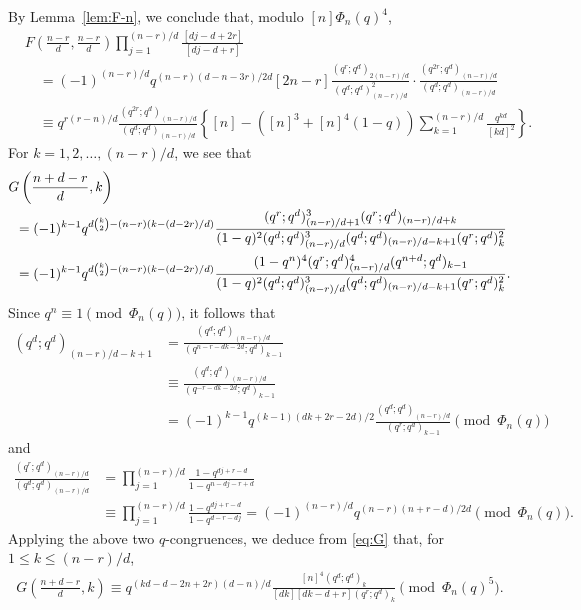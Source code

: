 \documentclass[12pt]{article}
\numberwithin{equation}{section}
\begin{document}
By Lemma~\ref{lem:F-n}, we conclude that, modulo $[n]\Phi_n(q)^4$,
\begin{align}\label{eq:F-final}
    &F\left(\frac{n-r}{d},\frac{n-r}{d}\right)\prod_{j=1}^{(n-r)/d}\frac{[dj-d+2r]}{[dj-d+r]}\nonumber\\
    &\hspace{1em}=(-1)^{(n-r)/d}q^{(n-r)(d-n-3r)/2d}[2n-r]\frac{(q^r;q^d)_{2(n-r)/d}}{(q^d;q^d)^2_{(n-r)/d}}\cdot
    \frac{(q^{2r};q^d)_{(n-r)/d}}{(q^d;q^d)_{(n-r)/d}}\nonumber\\
    &\hspace{1em}\equiv q^{r(r-n)/d}\frac{(q^{2r};q^d)_{(n-r)/d}}{(q^d;q^d)_{(n-r)/d}}\left\{[n]-([n]^3+[n]^4(1-q))
    \sum_{k=1}^{(n-r)/d}\frac{q^{kd}}{[kd]^2}\right\}.
\end{align}
For $k=1,2,\dots,(n-r)/d$, we see that 
\begin{align}\label{eq:G}
    &G\left(\frac{n+d-r}{d},k\right)\nonumber\\
    &\hspace{0.5em}=(-1)^{k-1}q^{d\binom{k}{2}-(n-r)(k-(d-2r)/d)}\frac{(q^r;q^d)^3_{(n-r)/d+1}(q^r;q^d)_{(n-r)/d+k}}
    {(1-q)^2(q^d;q^d)^3_{(n-r)/d}(q^d;q^d)_{(n-r)/d-k+1}(q^r;q^d)_k^2}\nonumber\\
    &\hspace{0.5em}=(-1)^{k-1}q^{d\binom{k}{2}-(n-r)(k-(d-2r)/d)}\frac{(1-q^n)^4(q^r;q^d)^4_{(n-r)/d}(q^{n+d};q^d)_{k-1}}
    {(1-q)^2(q^d;q^d)^3_{(n-r)/d}(q^d;q^d)_{(n-r)/d-k+1}(q^r;q^d)^2_k}.
\end{align}
Since $q^n\equiv 1\pmod{\Phi_n(q)}$, it follows that 
\begin{align*}
    (q^d;q^d)_{(n-r)/d-k+1}&=\frac{(q^d;q^d)_{(n-r)/d}}{(q^{n-r-dk-2d};q^d)_{k-1}}\nonumber\\
    &\equiv \frac{(q^d;q^d)_{(n-r)/d}}{(q^{-r-dk-2d};q^d)_{k-1}}\nonumber\\
    &=(-1)^{k-1}q^{(k-1)(dk+2r-2d)/2}\frac{(q^d;q^d)_{(n-r)/d}}{(q^{r};q^d)_{k-1}}\pmod{\Phi_n(q)}
\end{align*}
and 
\begin{align*}
    \frac{(q^r;q^d)_{(n-r)/d}}{(q^{d};q^d)_{(n-r)/d}}&=\prod_{j=1}^{(n-r)/d}\frac{1-q^{dj+r-d}}{1-q^{n-dj-r+d}}\nonumber\\
    &\equiv \prod_{j=1}^{(n-r)/d}\frac{1-q^{dj+r-d}}{1-q^{d-r-dj}}=(-1)^{(n-r)/d}q^{(n-r)(n+r-d)/2d}\pmod{\Phi_n(q)}.
\end{align*}
Applying the above two $q$-congruences, we deduce from \eqref{eq:G} that, for $1\leqslant k \leqslant (n-r)/d$,
\begin{align*}
    G\left(\frac{n+d-r}{d},k\right)\equiv q^{(kd-d-2n+2r)(d-n)/d}\frac{[n]^4(q^d;q^d)_{k}}{[dk][dk-d+r](q^r;q^d)_{k}}\pmod{\Phi_n(q)^5}.
\end{align*}
\end{document}
